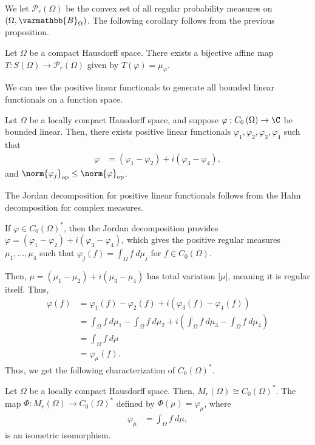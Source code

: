 \documentclass[10pt]{mypackage}
\renewcommand*{\mathbb}[1]{\varmathbb{#1}}
\newcommand{\B}{\mathbb{B}}
\begin{document}
We let $\mathcal{P}_r\left(\Omega\right)$ be the convex set of all regular probability measures on $\left(\Omega,\B_\Omega\right)$. The following corollary follows from the previous proposition.
\begin{corollary}
  Let $\Omega$ be a compact Hausdorff space. There exists a bijective affine map $T: S\left(\Omega\right)\rightarrow \mathcal{P}_{r}\left(\Omega\right)$ given by $T\left(\varphi\right) = \mu_{\varphi}$.
\end{corollary}
We can use the positive linear functionals to generate all bounded linear functionals on a function space.
\begin{theorem}
  Let $\Omega$ be a locally compact Hausdorff space, and suppose $\varphi: C_0\left(\Omega\right)\rightarrow \C$ be bounded linear. Then, there exists positive linear functionals $\varphi_1,\varphi_2,\varphi_3,\varphi_4$ such that
  \begin{align*}
    \varphi &= \left(\varphi_1-\varphi_2\right) + i\left(\varphi_3 - \varphi_4\right),
  \end{align*}
  and $\norm{\varphi_j}_{\text{op}}\leq \norm{\varphi}_{\text{op}}$.
\end{theorem}
\begin{remark}
  The Jordan decomposition for positive linear functionals follows from the Hahn decomposition for complex measures.
\end{remark}
If $\varphi\in C_0\left(\Omega\right)^{\ast}$, then the Jordan decomposition provides $\varphi = \left(\varphi_1-\varphi_2\right) + i\left(\varphi_3 - \varphi_4\right)$, which gives the positive regular measures $\mu_1,\dots,\mu_4$ such that $\varphi_j\left(f\right) = \int_{\Omega}f\:d\mu_j$ for $f\in C_0\left(\Omega\right)$.\newline

Then, $\mu = \left(\mu_1 - \mu_2\right) + i\left(\mu_3 - \mu_4\right)$ has total variation $\left\vert \mu \right\vert$, meaning it is regular itself. Thus,
\begin{align*}
  \varphi(f) &= \varphi_1\left(f\right) - \varphi_2\left(f\right) + i\left(\varphi_3\left(f\right) - \varphi_4\left(f\right)\right)\\
             &= \int_{\Omega}f\:d\mu_1 - \int_{\Omega}f\:d\mu_2 + i \left(\int_{\Omega}f\:d\mu_3 - \int_{\Omega}f\:d\mu_4\right)\\
             &= \int_{\Omega}f\:d\mu\\
             &= \varphi_{\mu}\left(f\right).
\end{align*}
Thus, we get the following characterization of $C_0\left(\Omega\right)^{\ast}$.
\begin{theorem}
  Let $\Omega$ be a locally compact Hausdorff space. Then, $M_r\left(\Omega\right) \cong C_0\left(\Omega\right)^{\ast}$. The map $\Phi: M_r\left(\Omega\right)\rightarrow C_0\left(\Omega\right)^{\ast}$ defined by $\Phi\left(\mu\right) = \varphi_{\mu}$, where
  \begin{align*}
    \varphi_\mu &= \int_{\Omega}f\:d\mu,
  \end{align*}
  is an isometric isomorphism.
\end{theorem}
\end{document}

